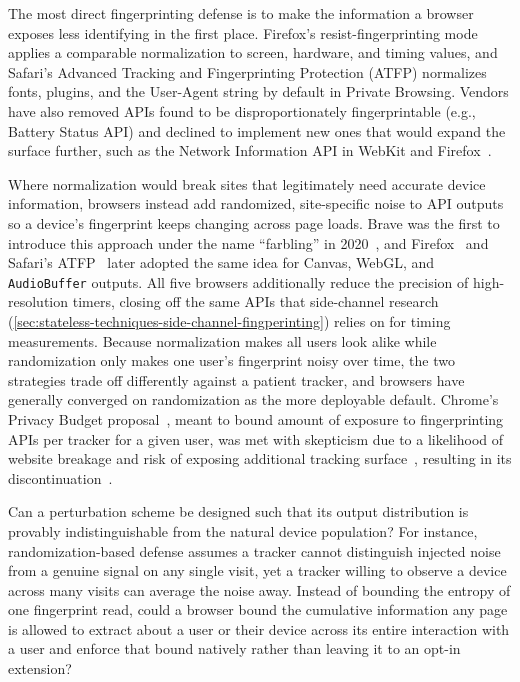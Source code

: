 %
The most direct fingerprinting defense is to make the information a browser exposes less identifying in the first place.
%
Firefox's resist-fingerprinting mode applies a comparable normalization to screen, hardware, and timing values, and Safari's Advanced Tracking and Fingerprinting Protection (ATFP) normalizes fonts, plugins, and the User-Agent string by default in Private Browsing.
%
Vendors have also removed APIs found to be disproportionately fingerprintable (e.g., Battery Status API) and declined to implement new ones that would expand the surface further, such as the Network Information API in WebKit and Firefox~\cite{TrackingPreventionWebKit2020}.


%
Where normalization would break sites that legitimately need accurate device information, browsers instead add randomized, site-specific noise to API outputs so a device's fingerprint keeps changing across page loads.
%
Brave was the first to introduce this approach under the name ``farbling'' in 2020~\cite{braveprivacyteamFingerprintingDefenses202020}, and Firefox~\cite{huang1816056FprandomizationMeta2023} and Safari's ATFP~\cite{wilanderPrivateBrowsing202024} later adopted the same idea for Canvas, WebGL, and \texttt{AudioBuffer} outputs.
%
All five browsers additionally reduce the precision of high-resolution timers, closing off the same APIs that side-channel research (\autoref{sec:stateless-techniques-side-channel-fingperinting}) relies on for timing measurements.
%
Because normalization makes all users look alike while randomization only makes one user's fingerprint noisy over time, the two strategies trade off differently against a patient tracker, and browsers have generally converged on randomization as the more deployable default. 
%
Chrome's Privacy Budget proposal~\cite{lasseyMikewestPrivacybudget2019}, meant to bound amount of exposure to fingerprinting APIs per tracker for a given user, was met with skepticism due to a likelihood of website breakage and risk of exposing additional tracking surface~\cite{snyderBraveFingerprintingPrivacy2019, rescorlaTechnicalCommentsPrivacy2021}, resulting in its discontinuation~\cite{leflerWhatHappenedPrivacy2024}.


\begin{opbox}
Can a perturbation scheme be designed such that its output distribution is provably indistinguishable from the natural device population?
%
For instance, randomization-based defense assumes a tracker cannot distinguish injected noise from a genuine signal on any single visit, yet a tracker willing to observe a device across many visits can average the noise away. 
%
Instead of bounding the entropy of one fingerprint read, could a browser bound the cumulative information any page is allowed to extract about a user or their device across its entire interaction with a user and enforce that bound natively rather than leaving it to an opt-in extension?
\end{opbox}


